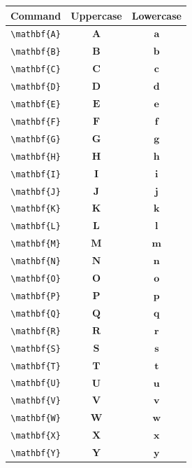 \documentclass[12pt,a4paper]{article}
\begin{document}
\begin{longtable}{|c|c|c|}
\hline
\textbf{Command} & \textbf{Uppercase} & \textbf{Lowercase} \\
\hline
\verb|\mathbf{A}| & $\mathbf{A}$ & $\mathbf{a}$ \\ %
\verb|\mathbf{B}| & $\mathbf{B}$ & $\mathbf{b}$ \\ %
\verb|\mathbf{C}| & $\mathbf{C}$ & $\mathbf{c}$ \\ %
\verb|\mathbf{D}| & $\mathbf{D}$ & $\mathbf{d}$ \\ %
\verb|\mathbf{E}| & $\mathbf{E}$ & $\mathbf{e}$ \\ %
\verb|\mathbf{F}| & $\mathbf{F}$ & $\mathbf{f}$ \\ %
\verb|\mathbf{G}| & $\mathbf{G}$ & $\mathbf{g}$ \\ %
\verb|\mathbf{H}| & $\mathbf{H}$ & $\mathbf{h}$ \\ %
\verb|\mathbf{I}| & $\mathbf{I}$ & $\mathbf{i}$ \\ %
\verb|\mathbf{J}| & $\mathbf{J}$ & $\mathbf{j}$ \\ %
\verb|\mathbf{K}| & $\mathbf{K}$ & $\mathbf{k}$ \\ %
\verb|\mathbf{L}| & $\mathbf{L}$ & $\mathbf{l}$ \\ %
\verb|\mathbf{M}| & $\mathbf{M}$ & $\mathbf{m}$ \\ %
\verb|\mathbf{N}| & $\mathbf{N}$ & $\mathbf{n}$ \\ %
\verb|\mathbf{O}| & $\mathbf{O}$ & $\mathbf{o}$ \\ %
\verb|\mathbf{P}| & $\mathbf{P}$ & $\mathbf{p}$ \\ %
\verb|\mathbf{Q}| & $\mathbf{Q}$ & $\mathbf{q}$ \\ %
\verb|\mathbf{R}| & $\mathbf{R}$ & $\mathbf{r}$ \\ %
\verb|\mathbf{S}| & $\mathbf{S}$ & $\mathbf{s}$ \\ %
\verb|\mathbf{T}| & $\mathbf{T}$ & $\mathbf{t}$ \\ %
\verb|\mathbf{U}| & $\mathbf{U}$ & $\mathbf{u}$ \\ %
\verb|\mathbf{V}| & $\mathbf{V}$ & $\mathbf{v}$ \\ %
\verb|\mathbf{W}| & $\mathbf{W}$ & $\mathbf{w}$ \\ %
\verb|\mathbf{X}| & $\mathbf{X}$ & $\mathbf{x}$ \\ %
\verb|\mathbf{Y}| & $\mathbf{Y}$ & $\mathbf{y}$ \\ %

\end{longtable}
\end{document}
